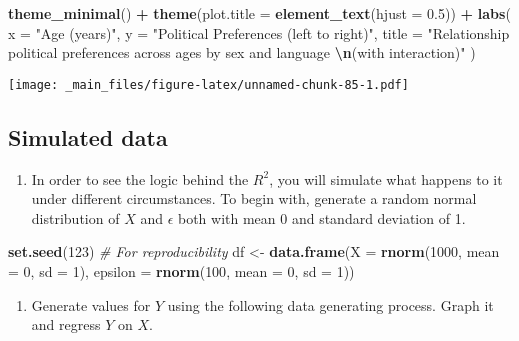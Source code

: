 \documentclass[
]{book}
\newenvironment{Shaded}{\begin{snugshade}}{\end{snugshade}}
\newcommand{\AttributeTok}[1]{\textcolor[rgb]{0.13,0.29,0.53}{#1}}
\newcommand{\CommentTok}[1]{\textcolor[rgb]{0.56,0.35,0.01}{\textit{#1}}}
\newcommand{\DecValTok}[1]{\textcolor[rgb]{0.00,0.00,0.81}{#1}}
\newcommand{\FloatTok}[1]{\textcolor[rgb]{0.00,0.00,0.81}{#1}}
\newcommand{\FunctionTok}[1]{\textcolor[rgb]{0.13,0.29,0.53}{\textbf{#1}}}
\newcommand{\NormalTok}[1]{#1}
\newcommand{\OtherTok}[1]{\textcolor[rgb]{0.56,0.35,0.01}{#1}}
\newcommand{\SpecialCharTok}[1]{\textcolor[rgb]{0.81,0.36,0.00}{\textbf{#1}}}
\newcommand{\StringTok}[1]{\textcolor[rgb]{0.31,0.60,0.02}{#1}}
\providecommand{\tightlist}{%
  \setlength{\itemsep}{0pt}\setlength{\parskip}{0pt}}
\begin{document}
\begin{Shaded}
\begin{Highlighting}[]
  
  \FunctionTok{theme\_minimal}\NormalTok{() }\SpecialCharTok{+}
  \FunctionTok{theme}\NormalTok{(}\AttributeTok{plot.title =} \FunctionTok{element\_text}\NormalTok{(}\AttributeTok{hjust =} \FloatTok{0.5}\NormalTok{)) }\SpecialCharTok{+}
  \FunctionTok{labs}\NormalTok{(}
    \AttributeTok{x =} \StringTok{"Age (years)"}\NormalTok{,}
    \AttributeTok{y =} \StringTok{"Political Preferences (left to right)"}\NormalTok{,}
    \AttributeTok{title =} \StringTok{"Relationship political preferences across ages by sex and language }\SpecialCharTok{\textbackslash{}n}\StringTok{(with interaction)"}
\NormalTok{  )}
\end{Highlighting}
\end{Shaded}

\texttt{[image: \_main\_files/figure-latex/unnamed-chunk-85-1.pdf]}

\hypertarget{simulated-data-1}{%
\subsection{Simulated data}\label{simulated-data-1}}

\begin{enumerate}
\def\labelenumi{\arabic{enumi}.}
\tightlist
\item
  In order to see the logic behind the \(R^2\), you will simulate what happens to it under different circumstances. To begin with, generate a random normal distribution of \(X\) and \(\epsilon\) both with mean 0 and standard deviation of 1.
\end{enumerate}

\begin{Shaded}
\begin{Highlighting}[]
\FunctionTok{set.seed}\NormalTok{(}\DecValTok{123}\NormalTok{)  }\CommentTok{\# For reproducibility}
\NormalTok{df }\OtherTok{\textless{}{-}} \FunctionTok{data.frame}\NormalTok{(}\AttributeTok{X =} \FunctionTok{rnorm}\NormalTok{(}\DecValTok{1000}\NormalTok{, }\AttributeTok{mean =} \DecValTok{0}\NormalTok{, }\AttributeTok{sd =} \DecValTok{1}\NormalTok{), }\AttributeTok{epsilon =} \FunctionTok{rnorm}\NormalTok{(}\DecValTok{100}\NormalTok{, }\AttributeTok{mean =} \DecValTok{0}\NormalTok{, }\AttributeTok{sd =} \DecValTok{1}\NormalTok{))}
\end{Highlighting}
\end{Shaded}

\begin{enumerate}
\def\labelenumi{\arabic{enumi}.}
\setcounter{enumi}{1}
\tightlist
\item
  Generate values for \(Y\) using the following data generating process. Graph it and regress \(Y\) on \(X\).
\end{enumerate}
\end{document}
